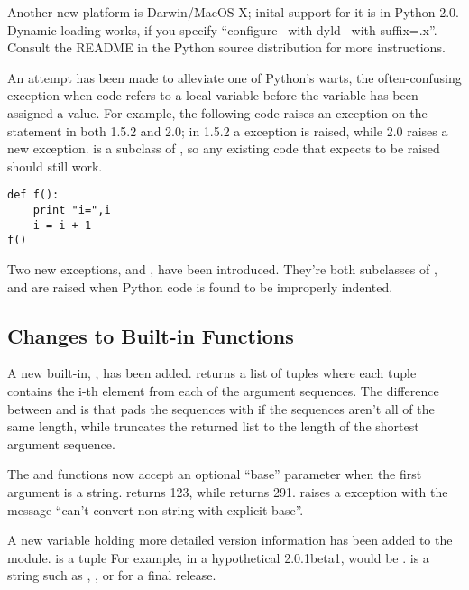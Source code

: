 \documentclass{howto}
\begin{document}
Another new platform is Darwin/MacOS X; inital support for it is in
Python 2.0.  Dynamic loading works, if you specify ``configure
--with-dyld --with-suffix=.x''.  Consult the README in the Python
source distribution for more instructions.

An attempt has been made to alleviate one of Python's warts, the
often-confusing  exception when code refers to a
local variable before the variable has been assigned a value.  For
example, the following code raises an exception on the 
statement in both 1.5.2 and 2.0; in 1.5.2 a 
exception is raised, while 2.0 raises a new
 exception.
 is a subclass of ,
so any existing code that expects  to be raised
should still work.

\begin{verbatim}
def f():
    print "i=",i
    i = i + 1 
f()
\end{verbatim}

Two new exceptions,  and
, have been introduced.  They're both
subclasses of , and are raised when Python code
is found to be improperly indented.

\subsection{Changes to Built-in Functions}

A new built-in, , has been
added.   returns a list of tuples where each tuple
contains the i-th element from each of the argument sequences.  The
difference between  and  is that  pads the sequences with
 if the sequences aren't all of the same length, while
 truncates the returned list to the length of the
shortest argument sequence.

The  and  functions now accept an
optional ``base'' parameter when the first argument is a string.
 returns 123, while  returns
291.   raises a  exception
with the message ``can't convert non-string with explicit base''.

A new variable holding more detailed version information has been
added to the  module.   is a tuple
 For example, in a hypothetical 2.0.1beta1,
 would be .
 is a string such as , , or
 for a final release.
\end{document}
